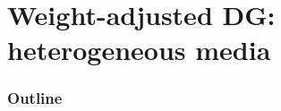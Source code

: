 \documentclass[compress]{beamer}
\begin{document}
%


\section{Weight-adjusted DG: heterogeneous media}

\begin{frame}[noframenumbering]
    \frametitle{Outline}
    \tableofcontents[currentsection]
\end{frame}
\end{document}
